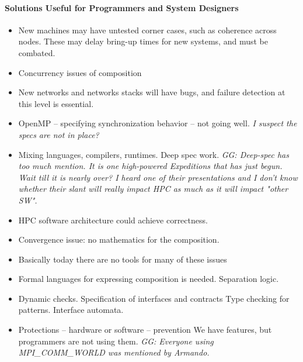  \paragraph{Solutions Useful for Programmers and System Designers}
 
\begin{itemize}
\item New machines may have untested
 corner cases, such as coherence across nodes.
 These may delay bring-up times for new systems, and must be
 combated.
 
\item  Concurrency issues of composition

\item  New networks and networks stacks will have bugs,
and failure detection at this level is essential.

 
\item  OpenMP – specifying synchronization behavior – not going well. {\small\em I suspect the specs are not in place?}

\item  Mixing languages, compilers, runtimes. Deep spec work. {\small\em GG: Deep-spec has too much mention. It
 is one high-powered Expeditions that has just begun. Wait
  till it is nearly over? I heard one of their presentations and I don't know whether their slant will really impact HPC as much as it will impact "other SW".}

\item HPC software architecture could achieve correctness. 

\item  Convergence issue: no mathematics for the composition. 

\item  Basically today there are no tools for many of these issues

\item  Formal languages for expressing composition is needed. Separation logic. 

\item  Dynamic checks. 
Specification of interfaces and contracts 
Type checking for patterns.
Interface automata.

\item  Protections – hardware or software – prevention
We have features, but programmers are not using them. {\small\em GG: Everyone using MPI\_COMM\_WORLD was mentioned by Armando.}

\end{itemize}
 

